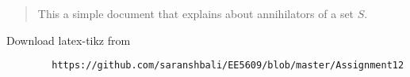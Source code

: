 \documentclass[journal,12pt,twocolumn]{IEEEtran}
\begin{document}
	\maketitle
	\newpage
	\bigskip
	\renewcommand{\thefigure}{\theenumi}
	\renewcommand{\thetable}{\theenumi}
	\begin{abstract}
		This a simple document that explains about annihilators of a set $S$.
	\end{abstract}
	Download latex-tikz from
	\begin{lstlisting}
		https://github.com/saranshbali/EE5609/blob/master/Assignment12
	\end{lstlisting}
\end{document}
